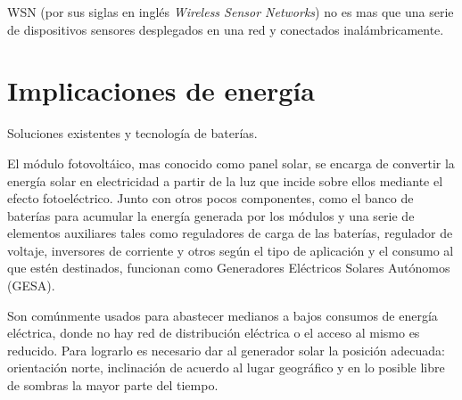 WSN (por sus siglas en inglés \textit{Wireless Sensor Networks}) no es mas que una serie de dispositivos sensores desplegados en una red y conectados inalámbricamente.


\section{Implicaciones de energía}
\label{sec:energía}

Soluciones existentes y tecnología de baterías.

El módulo fotovoltáico, mas conocido como panel solar, se encarga de convertir la energía solar en electricidad a partir de la luz que incide sobre ellos mediante el efecto fotoeléctrico. Junto con otros pocos componentes, como el banco de baterías para acumular la energía generada por los módulos y una serie de elementos auxiliares tales como reguladores de carga de las baterías, regulador de voltaje, inversores de corriente y otros según el tipo de aplicación y el consumo al que estén destinados, funcionan como Generadores Eléctricos Solares Autónomos (GESA).

Son comúnmente usados para abastecer medianos a bajos consumos de energía eléctrica, donde no hay red de distribución eléctrica o el acceso al mismo es reducido. Para lograrlo es necesario dar al generador solar la posición adecuada: orientación norte, inclinación de acuerdo al lugar geográfico y en lo posible libre de sombras la mayor parte del tiempo.


